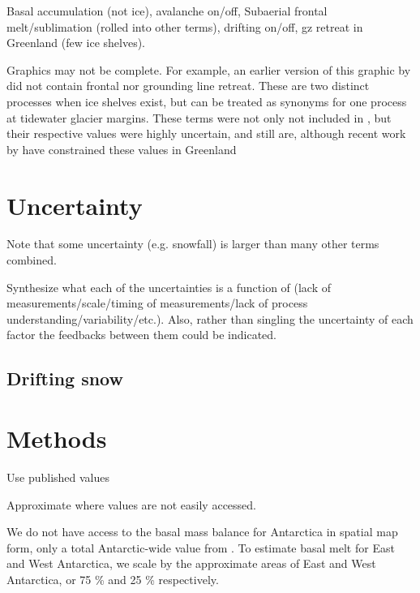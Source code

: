 \documentclass[review,jog]{igs}
\begin{document}
Basal accumulation (not ice), avalanche on/off, Subaerial frontal melt/sublimation (rolled into other terms), drifting on/off, gz retreat in Greenland (few ice shelves).

Graphics may not be complete. For example, an earlier version of this graphic by \citet[Fig. 2]{cogley_2011} did not contain frontal nor grounding line retreat. These are two distinct processes when ice shelves exist, but can be treated as synonyms for one process at tidewater glacier margins. These terms were not only not included in \citet{cogley_2011}, but their respective values were highly uncertain, and still are, although recent work by \citet{kochtitzky_2023,greene_2024} have constrained these values in Greenland

\section{Uncertainty}

Note that some uncertainty (e.g. snowfall) is larger than many other terms combined.

Synthesize what each of the uncertainties is a function of (lack of measurements/scale/timing of measurements/lack of process understanding/variability/etc.). Also, rather than singling the uncertainty of each factor the feedbacks between them could be indicated.

\subsection{Drifting snow}


\section{Methods}

Use published values

Approximate where values are not easily accessed.

We do not have access to the basal mass balance for Antarctica in spatial map form, only a total Antarctic-wide value from \citet{pattyn_2010}. To estimate basal melt for East and West Antarctica, we scale by the approximate areas of East and West Antarctica, or 75 \% and 25 \% respectively.
\end{document}
